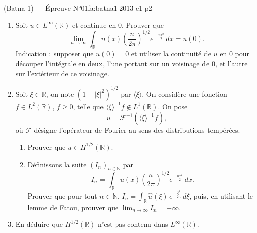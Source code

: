\begin{problem}{(Batna 1) — Épreuve N°01}{fa:batna1-2013-e1-p2}
\begin{enumerate}\item Soit $u\in L^\infty(\mathbb{R})$ et continue en $0$. Prouver que
$$\lim_{n\to\infty}\int_{\mathbb{R}}u(x)\left(\frac{n}{2\pi}\right)^{1/2}e^{-\frac{nx^2}{2}}\,dx=u(0).$$
Indication : supposer que $u(0)=0$ et utiliser la continuité de $u$ en $0$ pour découper l'intégrale en deux, l'une portant sur un voisinage de $0$, et l'autre sur l'extérieur de ce voisinage.
\item Soit $\xi\in\mathbb{R}$, on note $(1+|\xi|^2)^{1/2}$ par $\langle\xi\rangle$. On considère une fonction $f\in L^2(\mathbb{R})$, $f\geq0$, telle que $\langle\xi\rangle^{-1}f\notin L^1(\mathbb{R})$. On pose
$$u=\mathcal{F}^{-1}\left(\langle\xi\rangle^{-1}f\right),$$
où $\mathcal{F}$ désigne l'opérateur de Fourier au sens des distributions tempérées.
\begin{enumerate}\item Prouver que $u\in H^{1/2}(\mathbb{R})$.\item Définissons la suite $(I_n)_{n\in\mathbb{N}}$ par
$$I_n=\int_{\mathbb{R}}u(x)\left(\frac{n}{2\pi}\right)^{1/2}e^{-\frac{nx^2}{2}}\,dx.$$
Prouver que pour tout $n\in\mathbb{N}$, $I_n=\int_{\mathbb{R}}\hat{u}(\xi)\,e^{-\frac{\xi^2}{2n}}\,d\xi$, puis, en utilisant le lemme de Fatou, prouver que $\lim_{n\to\infty}I_n=+\infty$.\end{enumerate}
\item En déduire que $H^{1/2}(\mathbb{R})$ n'est pas contenu dans $L^\infty(\mathbb{R})$.\end{enumerate}
\end{problem}
\newpage

